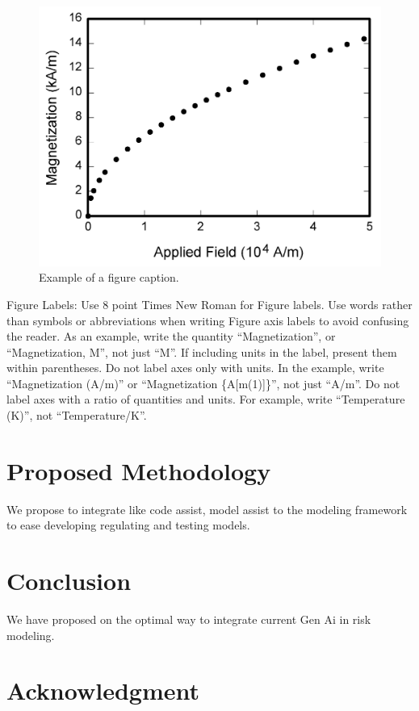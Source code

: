 \documentclass[conference]{IEEEtran}
\begin{document}
\begin{figure}[htbp]
\centerline{\includegraphics{fig1.png}}
\caption{Example of a figure caption.}
\label{fig}
\end{figure}

Figure Labels: Use 8 point Times New Roman for Figure labels. Use words 
rather than symbols or abbreviations when writing Figure axis labels to 
avoid confusing the reader. As an example, write the quantity 
``Magnetization'', or ``Magnetization, M'', not just ``M''. If including 
units in the label, present them within parentheses. Do not label axes only 
with units. In the example, write ``Magnetization (A/m)'' or ``Magnetization 
\{A[m(1)]\}'', not just ``A/m''. Do not label axes with a ratio of 
quantities and units. For example, write ``Temperature (K)'', not 
``Temperature/K''.


\section{Proposed Methodology}
We propose to integrate like code assist, model assist to the modeling framework to ease developing regulating and testing models.

\section{Conclusion}

We have proposed on the optimal way to integrate current Gen Ai in risk modeling.


\section*{Acknowledgment}
\end{document}
